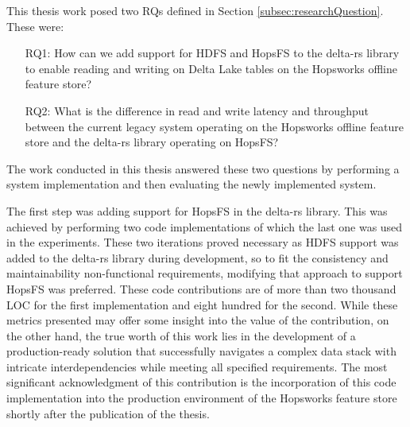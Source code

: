 This thesis work posed two \glspl{RQ} defined in Section \ref{subsec:researchQuestion}. These were: 
\begin{enumerate}
    \item[RQ1:] How can we add support for \gls{HDFS} and \gls{HopsFS} to the delta-rs library to enable reading and writing on Delta Lake tables on the Hopsworks offline feature store?
    \item[RQ2:] What is the difference in read and write latency and throughput between the current legacy system operating on the Hopsworks offline feature store and the delta-rs library operating on HopsFS?
\end{enumerate}
The work conducted in this thesis answered these two questions by performing a system implementation and then evaluating the newly implemented system. 

The first step was adding support for \gls{HopsFS} in the delta-rs library. This was achieved by performing two code implementations of which the last one was used in the experiments. These two iterations proved necessary as \gls{HDFS} support was added to the delta-rs library during development, so to fit the consistency and maintainability non-functional requirements, modifying that approach to support \gls{HopsFS} was preferred. These code contributions are of more than two thousand \gls{LOC} for the first implementation and eight hundred for the second. While these metrics presented may offer some insight into the value of the contribution, on the other hand, the true worth of this work lies in the development of a production-ready solution that successfully navigates a complex data stack with intricate interdependencies while meeting all specified requirements. The most significant acknowledgment of this contribution is the incorporation of this code implementation into the production environment of the Hopsworks feature store shortly after the publication of the thesis.

